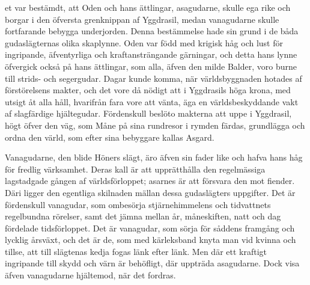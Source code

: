 
\dropcapD et var bestämdt, att Oden och hans ättlingar, asagudarne, skulle ega
rike och borgar i den öfversta grenknippan af Yggdrasil, medan
vanagudarne skulle fortfarande bebygga underjorden. Denna bestämmelse
hade sin grund i de båda gudaslägternas olika skaplynne. Oden var född
med krigisk håg och lust för ingripande, äfventyrliga och
kraftansträngande gärningar, och detta hans lynne öfvergick också på
hans ättlingar, som alla, äfven den milde Balder, voro burne till
strids- och segergudar. Dagar kunde komma, när världsbyggnaden hotades
af förstörelsens makter, och det vore då nödigt att i Yggdrasils höga
krona, med utsigt åt alla håll, hvarifrån fara vore att vänta, äga en
världsbeskyddande vakt af slagfärdige hjältegudar. Fördenskull beslöto
makterna att uppe i Yggdrasil, högt öfver den väg, som Måne på sina
rundresor i rymden färdas, grundlägga och ordna den värld, som efter
sina bebyggare kallas Asgard.

Vanagudarne, den blide Höners slägt, äro äfven sin fader like och hafva
hans håg för fredlig värksamhet. Deras kall är att upprätthålla den
regelmässiga lagstadgade gången af världsförloppet; asarnes är att
försvara den mot fiender. Däri ligger den egentliga skilnaden mällan
dessa gudaslägters uppgifter. Det är fördenskull vanagudar, som
ombesörja stjärnehimmelens och tidvattnets regelbundna rörelser, samt
det jämna mellan år, måneskiften, natt och dag fördelade tidsförloppet.
Det är vanagudar, som sörja för såddens framgång och lycklig årsväxt,
och det är de, som med kärleksband knyta man vid kvinna och tillse, att
till slägtenas kedja fogas länk efter länk. Men där ett kraftigt
ingripande till skydd och värn är behöfligt, där uppträda asagudarne.
Dock visa äfven vanagudarne hjältemod, när det fordras.

